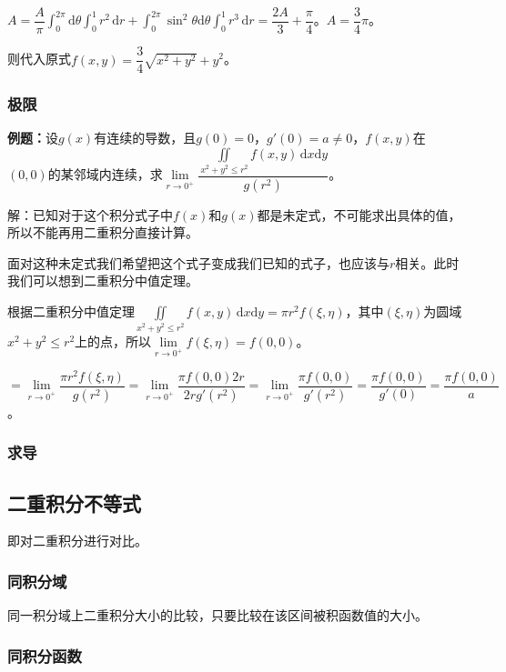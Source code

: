 \documentclass[UTF8, 12pt]{ctexart}
\begin{document}
$A=\dfrac{A}{\pi}\int_0^{2\pi}\textrm{d}\theta\int_0^1r^2\,\textrm{d}r+\int_0^{2\pi}\sin^2\theta\textrm{d}\theta\int_0^1r^3\,\textrm{d}r=\dfrac{2A}{3}+\dfrac{\pi}{4}$。$A=\dfrac{3}{4}\pi$。

则代入原式$f(x,y)=\dfrac{3}{4}\sqrt{x^2+y^2}+y^2$。

\subsubsection{极限}

\textbf{例题：}设$g(x)$有连续的导数，且$g(0)=0$，$g'(0)=a\neq0$，$f(x,y)$在$(0,0)$的某邻域内连续，求$\lim\limits_{r\to0^+}\dfrac{\iint\limits_{x^2+y^2\leqslant r^2}f(x,y)\,\textrm{d}x\textrm{d}y}{g(r^2)}$。

解：已知对于这个积分式子中$f(x)$和$g(x)$都是未定式，不可能求出具体的值，所以不能再用二重积分直接计算。

面对这种未定式我们希望把这个式子变成我们已知的式子，也应该与$r$相关。此时我们可以想到二重积分中值定理。

根据二重积分中值定理$\iint\limits_{x^2+y^2\leqslant r^2}f(x,y)\,\textrm{d}x\textrm{d}y=\pi r^2f(\xi,\eta)$，其中$(\xi,\eta)$为圆域$x^2+y^2\leqslant r^2$上的点，所以$\lim\limits_{r\to0^+}f(\xi,\eta)=f(0,0)$。

$=\lim\limits_{r\to0^+}\dfrac{\pi r^2f(\xi,\eta)}{g(r^2)}=\lim\limits_{r\to0^+}\dfrac{\pi f(0,0)2r}{2rg'(r^2)}=\lim\limits_{r\to0^+}\dfrac{\pi f(0,0)}{g'(r^2)}=\dfrac{\pi f(0,0)}{g'(0)}=\dfrac{\pi f(0,0)}{a}$。

\subsubsection{求导}

\subsection{二重积分不等式}

即对二重积分进行对比。

\subsubsection{同积分域}

同一积分域上二重积分大小的比较，只要比较在该区间被积函数值的大小。

\subsubsection{同积分函数}
\end{document}
